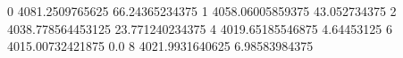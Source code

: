0 4081.2509765625 66.24365234375
1 4058.06005859375 43.052734375
2 4038.778564453125 23.771240234375
4 4019.65185546875 4.64453125
6 4015.00732421875 0.0
8 4021.9931640625 6.98583984375
